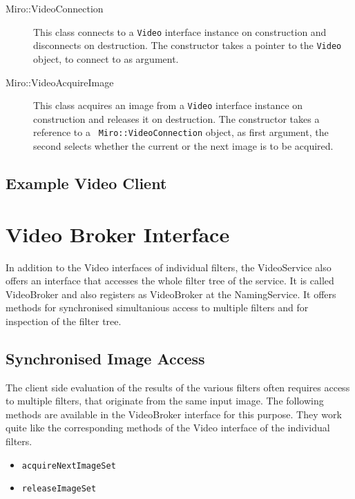 \begin{description}
\item[Miro::VideoConnection] This class connects to a {\tt Video}
  interface instance on construction and disconnects on destruction.
  The constructor takes a pointer to the {\tt Video} object, to
  connect to as argument.
\item[Miro::VideoAcquireImage] This class acquires an image from a
  {\tt Video} interface instance on construction and releases it on
  destruction. The constructor takes a reference to a {\tt
    Miro::VideoConnection} object, as first argument, the second
  selects whether the current or the next image is to be acquired.
\end{description}

\subsection{Example Video Client}


\label{lst:VideoExample}

\section{Video Broker Interface}

In addition to the Video interfaces of individual filters, the
VideoService also offers an interface that accesses the whole filter
tree of the service. It is called VideoBroker and also registers as
VideoBroker at the NamingService. It offers methods for synchronised
simultanious access to multiple filters and for inspection of the
filter tree.

\subsection{Synchronised Image Access}

The client side evaluation of the results of the various filters often
requires access to multiple filters, that originate from the same
input image. The following methods are available in the VideoBroker
interface for this purpose. They work quite like the corresponding
methods of the Video interface of the  individual filters.

\begin{itemize}
\item {\tt acquireNextImageSet}
\item {\tt releaseImageSet}
\end{itemize}

